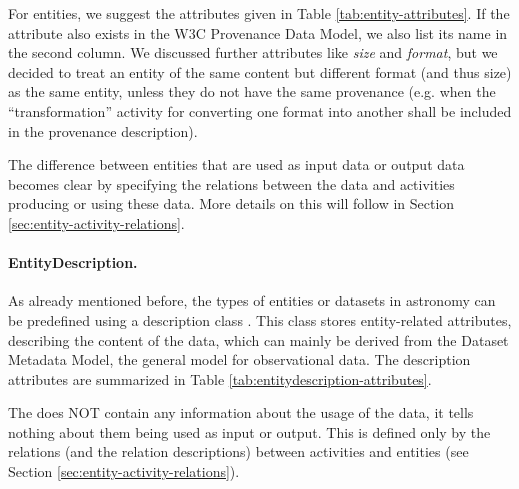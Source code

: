 For entities, we suggest the attributes given in Table 
\ref{tab:entity-attributes}. If the attribute also exists in the W3C 
Provenance Data Model, we also list its name in the second column.
We discussed further attributes like \emph{size} and \emph{format}, but we decided to treat an
entity of the same content but different format (and thus size) as the same entity,
unless they do not have the same provenance (e.g. when the ``transformation'' activity
for converting one format into another shall be included in the provenance description).


The difference between entities that are used as input data or output data 
becomes clear by specifying the relations between the data and activities producing or using these data.
More details on this will follow in Section \ref{sec:entity-activity-relations}.

\paragraph{EntityDescription.}
As already mentioned before, the types of entities or datasets in astronomy 
can be predefined using a description
class .
This class stores entity-related 
attributes, describing the content of the data, which can mainly be derived from 
the Dataset Metadata Model, the general model for observational data.
The description attributes are summarized in Table 
\ref{tab:entitydescription-attributes}.

The  does NOT contain any information about the usage 
of the data, it tells nothing about them being used as input or output. This is 
defined only by the relations (and the relation descriptions) between activities
and entities (see Section \ref{sec:entity-activity-relations}).


